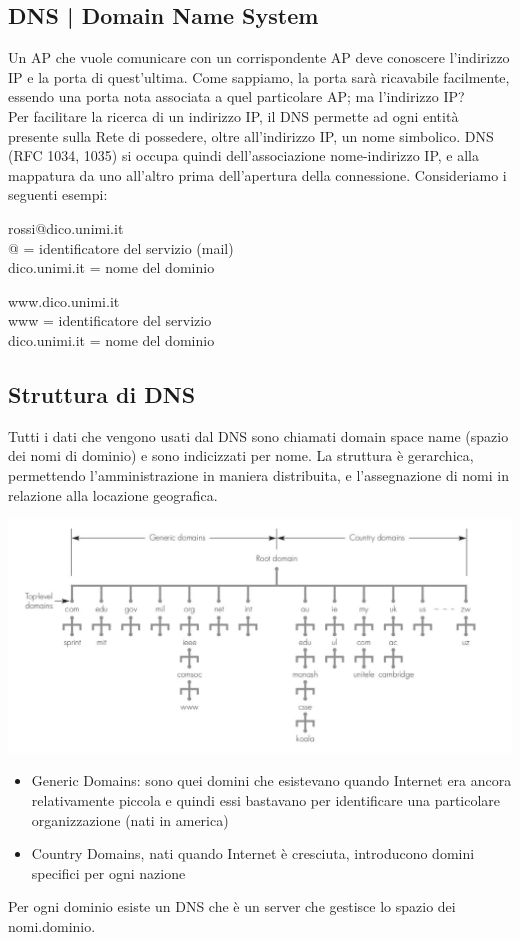 \documentclass[11pt, oneside]{article}   	%
\begin{document}
\subsection*{DNS | Domain Name System}
Un AP che vuole comunicare con un corrispondente AP deve conoscere l’indirizzo IP e la porta di quest’ultima. Come sappiamo, la porta sarà ricavabile facilmente, essendo una porta nota associata a quel particolare AP; ma l’indirizzo IP?\\
Per facilitare la ricerca di un indirizzo IP, il DNS permette ad ogni entità presente sulla Rete di possedere, oltre all’indirizzo IP, un nome simbolico. DNS (RFC 1034, 1035) si occupa quindi dell’associazione nome-indirizzo IP, e alla mappatura da uno all’altro prima dell’apertura della connessione. Consideriamo i seguenti esempi:
\begin{center}
rossi@dico.unimi.it\\
@ = identificatore del servizio (mail)\\
dico.unimi.it = nome del dominio\\
\par\noindent\hrulefill\par
www.dico.unimi.it\\
www = identificatore del servizio\\
dico.unimi.it = nome del dominio
\end{center}
\subsection*{Struttura di DNS}
Tutti i dati che vengono usati dal DNS sono chiamati domain space name (spazio dei nomi di dominio) e sono indicizzati per nome. La struttura è gerarchica, permettendo l'amministrazione in maniera distribuita, e l'assegnazione di nomi in relazione alla locazione geografica.
\begin{center}
\includegraphics[scale=0.5]{7}
\end{center}
\begin{itemize}
\item Generic Domains: sono quei domini che esistevano quando Internet era ancora relativamente piccola e quindi essi bastavano per identificare una particolare organizzazione (nati in america)
\item Country Domains, nati quando Internet è cresciuta, introducono domini specifici per ogni nazione
\end{itemize}
Per ogni dominio esiste un DNS che è un server che gestisce lo spazio dei nomi.dominio.
\end{document}
